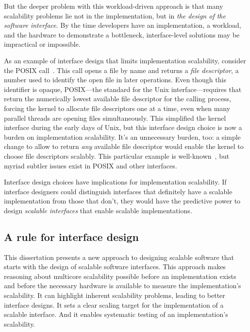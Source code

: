 But the deeper problem with this workload-driven approach is that many
scalability problems lie not in the implementation, but in \emph{the design
of the
software interface}.  By the time developers have an implementation, a
workload, and the hardware to demonstrate a bottleneck,
interface-level solutions may be impractical or impossible.

As an example of interface design that limits implementation
scalability, consider the POSIX  call~\cite{posix2013}.
%
This call opens a
file by name and returns a \emph{file descriptor}, a number used to
identify the open file in later operations.
%
Even though this identifier is opaque, POSIX---the standard for the
Unix interface---requires that 
return the numerically lowest available file descriptor for the
calling process, forcing the kernel to allocate file descriptors one
at a time, even when many parallel threads are opening files
simultaneously.
%
This simplified the kernel interface during the early days of Unix,
but this interface design choice is now a burden on implementation
scalability.
%
It's an unnecessary burden, too: a simple change to allow 
to return \emph{any} available file descriptor would enable the kernel
to choose file descriptors scalably.
%
This particular example is well-known~\cite{boyd-wickizer:corey}, but
myriad subtler issues exist in POSIX and other interfaces.

Interface design choices have implications for implementation
scalability.
%
If interface designers could distinguish interfaces that definitely
have a scalable implementation from those that don't, they would have
the predictive power to design \emph{scalable interfaces} that enable
scalable implementations.


\subsection{A rule for interface design}

This dissertation presents a new approach to designing scalable software
that starts with the design of scalable software interfaces.
%
This approach makes reasoning about multicore scalability possible
before an implementation exists and before the necessary hardware is
available to measure the implementation's scalability.
%
It can highlight inherent scalability problems, leading to better
interface designs.
%
It sets a clear scaling target for the implementation of a
scalable interface.  And it enables systematic testing of an
implementation's scalability.

